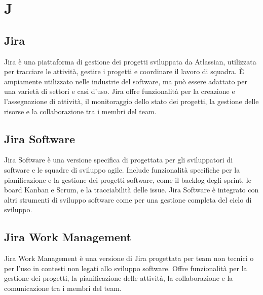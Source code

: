 \section{J}

\vspace{2em}
\subsection*{Jira}
Jira è una piattaforma di gestione dei progetti sviluppata da Atlassian, utilizzata per tracciare le attività, gestire i progetti e coordinare il lavoro di squadra. È ampiamente utilizzato nelle industrie del software, ma può essere adattato per una varietà di settori e casi d'uso. Jira offre funzionalità per la creazione e l'assegnazione di attività, il monitoraggio dello stato dei progetti, la gestione delle risorse e la collaborazione tra i membri del team.

\vspace{2em}
\subsection*{Jira Software}
Jira Software è una versione specifica di  progettata per gli sviluppatori di software e le squadre di sviluppo agile. Include funzionalità specifiche per la pianificazione e la gestione dei progetti software, come il backlog degli sprint, le board Kanban e Scrum, e la tracciabilità delle issue. Jira Software è integrato con altri strumenti di sviluppo software come  per una gestione completa del ciclo di sviluppo.

\vspace{2em}
\subsection*{Jira Work Management}
Jira Work Management è una versione di Jira progettata per team non tecnici o per l'uso in contesti non legati allo sviluppo software. Offre funzionalità per la gestione dei progetti, la pianificazione delle attività, la collaborazione e la comunicazione tra i membri del team.
